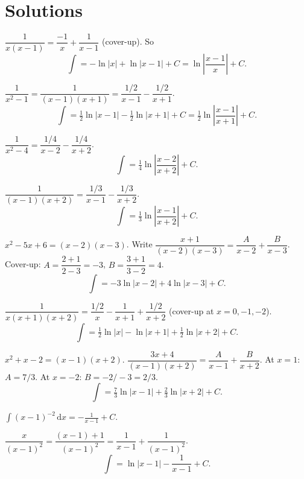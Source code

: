\section{Solutions}

\begin{solutions}
  \item $\dfrac{1}{x(x-1)}=\dfrac{-1}{x}+\dfrac{1}{x-1}$ (cover-up). So
        \[
          \int = -\ln|x|+\ln|x-1|+C = \ln\left|\frac{x-1}{x}\right|+C .
        \]

  \item $\dfrac{1}{x^{2}-1}=\dfrac{1}{(x-1)(x+1)}
        =\dfrac{1/2}{x-1}-\dfrac{1/2}{x+1}$.
        \[
          \int = \tfrac12\ln|x-1|-\tfrac12\ln|x+1|+C
               = \tfrac12\ln\left|\frac{x-1}{x+1}\right|+C .
        \]

  \item $\dfrac{1}{x^{2}-4}=\dfrac{1/4}{x-2}-\dfrac{1/4}{x+2}$.
        \[
          \int = \tfrac14\ln\left|\frac{x-2}{x+2}\right|+C .
        \]

  \item $\dfrac{1}{(x-1)(x+2)}=\dfrac{1/3}{x-1}-\dfrac{1/3}{x+2}$.
        \[
          \int = \tfrac13\ln\left|\frac{x-1}{x+2}\right|+C .
        \]

  \item $x^{2}-5x+6=(x-2)(x-3)$. Write
        $\dfrac{x+1}{(x-2)(x-3)}=\dfrac{A}{x-2}+\dfrac{B}{x-3}$. Cover-up:
        $A=\dfrac{2+1}{2-3}=-3$, $B=\dfrac{3+1}{3-2}=4$.
        \[
          \int = -3\ln|x-2|+4\ln|x-3|+C .
        \]

  \item $\dfrac{1}{x(x+1)(x+2)}=\dfrac{1/2}{x}-\dfrac{1}{x+1}+\dfrac{1/2}{x+2}$
        (cover-up at $x=0,-1,-2$).
        \[
          \int = \tfrac12\ln|x|-\ln|x+1|+\tfrac12\ln|x+2|+C .
        \]

  \item $x^{2}+x-2=(x-1)(x+2)$.
        $\dfrac{3x+4}{(x-1)(x+2)}=\dfrac{A}{x-1}+\dfrac{B}{x+2}$. At
        $x=1$: $A=7/3$. At $x=-2$: $B=-2/-3=2/3$.
        \[
          \int = \tfrac73\ln|x-1|+\tfrac23\ln|x+2|+C .
        \]

  \item $\displaystyle\int (x-1)^{-2}\,\mathrm{d}x = -\frac{1}{x-1}+C$.

  \item $\dfrac{x}{(x-1)^{2}}=\dfrac{(x-1)+1}{(x-1)^{2}}
        =\dfrac{1}{x-1}+\dfrac{1}{(x-1)^{2}}$.
        \[
          \int = \ln|x-1|-\frac{1}{x-1}+C .
        \]


\end{solutions}
